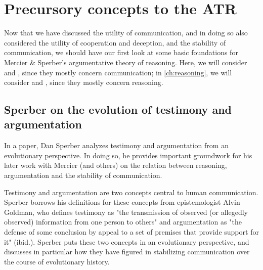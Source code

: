 \section{Precursory concepts to the ATR}
\label{sec:comm-ATR}

Now that we have discussed the utility of communication, and in doing so also considered the utility of cooperation and deception, and the stability of communication, we should have our first look at some basic foundations for Mercier \& Sperber's argumentative theory of reasoning. Here, we will consider \citet{Sperber01} and \citet{Sperber10}, since they mostly concern communication; in \cref{ch:reasoning}, we will consider \citet{MS09} and \citet{MS11}, since they mostly concern reasoning.

\subsection{Sperber on the evolution of testimony and argumentation}
\label{sec:Sperber01}

In a \citeyear{Sperber01} paper, Dan Sperber analyzes testimony and argumentation from an evolutionary perspective. In doing so, he provides important groundwork for his later work with Mercier (and others) on the relation between reasoning, argumentation and the stability of communication.

Testimony and argumentation are two concepts central to human communication. Sperber borrows his definitions for these concepts from epistemologist Alvin Goldman, who defines testimony as "the transmission of observed (or allegedly observed) information from one person to others" \citep[p.~401]{Sperber01} and argumentation as "the defense of some conclusion by appeal to a set of premises that provide support for it" (ibid.).
Sperber puts these two concepts in an evolutionary perspective, and discusses in particular how they have figured in stabilizing communication over the course of evolutionary history.

